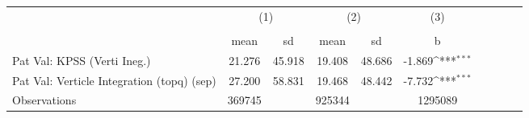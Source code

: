 {
\def\sym#1{\ifmmode^{#1}\else\(^{#1}\)\fi}
\begin{tabular}{l*{3}{ccc}}
\hline\hline
                    &\multicolumn{2}{c}{(1)}  &\multicolumn{2}{c}{(2)}  &\multicolumn{1}{c}{(3)}\\
                    &\multicolumn{2}{c}{}     &\multicolumn{2}{c}{}     &\multicolumn{1}{c}{} \\
                    &        mean&          sd&        mean&          sd&           b         \\
\hline
Pat Val: KPSS (Verti Ineg.)&      21.276&      45.918&      19.408&      48.686&      -1.869\sym{***}\\
Pat Val: Verticle Integration (topq) (sep)&      27.200&      58.831&      19.468&      48.442&      -7.732\sym{***}\\
\hline
Observations        &      369745&            &      925344&            &     1295089         \\
\hline\hline
\end{tabular}
}
